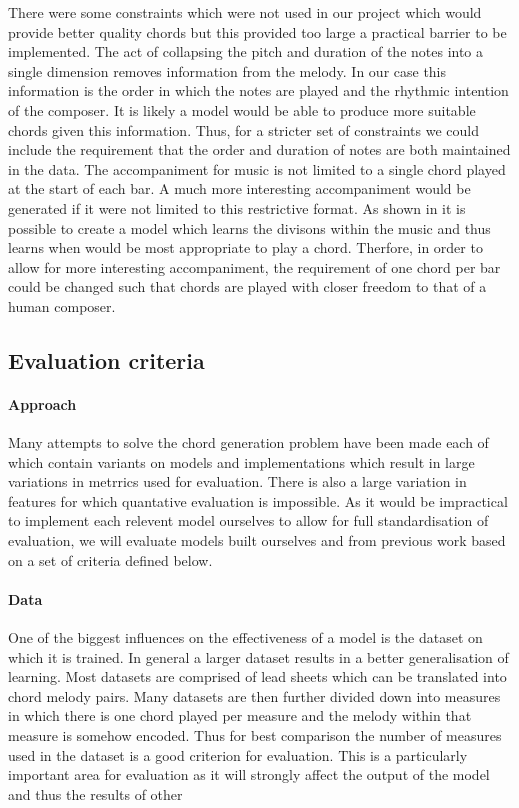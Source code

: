 There were some constraints which were not used in our project which would provide better quality chords but this provided too large a practical barrier to be implemented.
The act of collapsing the pitch and duration of the notes into a single dimension removes information from the melody.
In our case this information is the order in which the notes are played and the rhythmic intention of the composer.
It is likely a model would be able to produce more suitable chords given this information.
Thus, for a stricter set of constraints we could include the requirement that the order and duration of notes are both maintained in the data.
The accompaniment for music is not limited to a single chord played at the start of each bar.
A much more interesting accompaniment would be generated if it were not limited to this restrictive format.
As shown in \cite{ReinforcementLearning} it is possible to create a model which learns the divisons within the music and thus learns when would be most appropriate to play a chord.
Therfore, in order to allow for more interesting accompaniment, the requirement of one chord per bar could be changed such that chords are played with closer freedom to that of a human composer.

\subsection{Evaluation criteria}
\paragraph{Approach}
Many attempts to solve the chord generation problem have been made each of which contain variants on models and implementations which result in large variations in metrrics used for evaluation.
There is also a large variation in features for which quantative evaluation is impossible. 
As it would be impractical to implement each relevent model ourselves to allow for full standardisation of evaluation, we will evaluate models built ourselves and from previous work based on a set of criteria defined below.
\paragraph{Data}
One of the biggest influences on the effectiveness of a model is the dataset on which it is trained. 
In general a larger dataset results in a better generalisation of learning. %
Most datasets are comprised of lead sheets which can be translated into chord melody pairs.
Many datasets are then further divided down into measures in which there is one chord played per measure and the melody within that measure is somehow encoded.
Thus for best comparison the number of measures used in the dataset is a good criterion for evaluation.
This is a particularly important area for evaluation as it will strongly affect the output of the model and thus the results of other 

